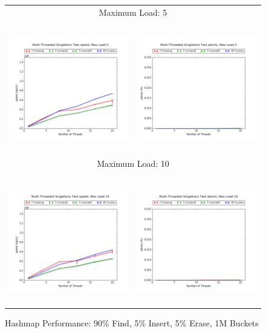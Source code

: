 \begin{figure}[h!]
    \centering
    \caption{Hashmap Performance: 90\% Find, 5\% Insert, 5\% Erase, 1M Buckets}
    \begin{tabular}{|cc|}
        \hline 
        \multicolumn{2}{|c|}{{\footnotesize Maximum Load: 5}}\\
        \includegraphics[height=2.25in]{maps/5HM1M:F90,I5,E5speed.png} &
        \includegraphics[height=2.25in]{maps/5HM1M:F90,I5,E5aborts.png}\\
        \hline 
        \multicolumn{2}{|c|}{{\footnotesize Maximum Load: 10}}\\
        \includegraphics[height=2.25in]{maps/10HM1M:F90,I5,E5speed.png} &
        \includegraphics[height=2.25in]{maps/10HM1M:F90,I5,E5aborts.png}\\

\end{tabular}
\end{figure}
